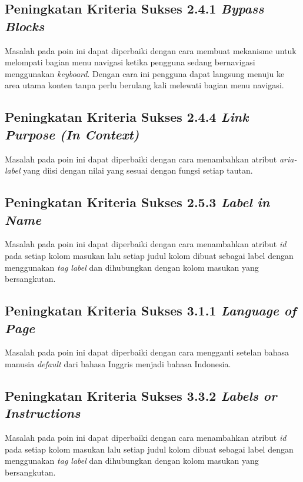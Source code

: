\subsection{Peningkatan Kriteria Sukses 2.4.1 \textit{Bypass Blocks}}
\label{subsec:peningkatan_kriteria_sukses_2.4.1}
Masalah pada poin ini dapat diperbaiki dengan cara membuat mekanisme untuk melompati bagian menu navigasi ketika pengguna sedang bernavigasi menggunakan \textit{keyboard}. Dengan cara ini pengguna dapat langsung menuju ke area utama konten tanpa perlu berulang kali melewati bagian menu navigasi.

\subsection{Peningkatan Kriteria Sukses 2.4.4 \textit{Link Purpose (In Context)}}
\label{subsec:peningkatan_kriteria_sukses_2.4.4}
Masalah pada poin ini dapat diperbaiki dengan cara menambahkan atribut \textit{aria-label} yang diisi dengan nilai yang sesuai dengan fungsi setiap tautan.

\subsection{Peningkatan Kriteria Sukses 2.5.3 \textit{Label in Name}}
\label{subsec:peningkatan_kriteria_sukses_2.5.3}
Masalah pada poin ini dapat diperbaiki dengan cara menambahkan atribut \textit{id} pada setiap kolom masukan lalu setiap judul kolom dibuat sebagai label dengan menggunakan \textit{tag label} dan dihubungkan dengan kolom masukan yang bersangkutan.

\subsection{Peningkatan Kriteria Sukses 3.1.1 \textit{Language of Page}}
\label{subsec:peningkatan_kriteria_sukses_3.1.1}
Masalah pada poin ini dapat diperbaiki dengan cara mengganti setelan bahasa manusia \textit{default} dari bahasa Inggris menjadi bahasa Indonesia.

\subsection{Peningkatan Kriteria Sukses 3.3.2 \textit{Labels or Instructions}}
\label{subsec:peningkatan_kriteria_sukses_3.3.2}
Masalah pada poin ini dapat diperbaiki dengan cara menambahkan atribut \textit{id} pada setiap kolom masukan lalu setiap judul kolom dibuat sebagai label dengan menggunakan \textit{tag label} dan dihubungkan dengan kolom masukan yang bersangkutan.

